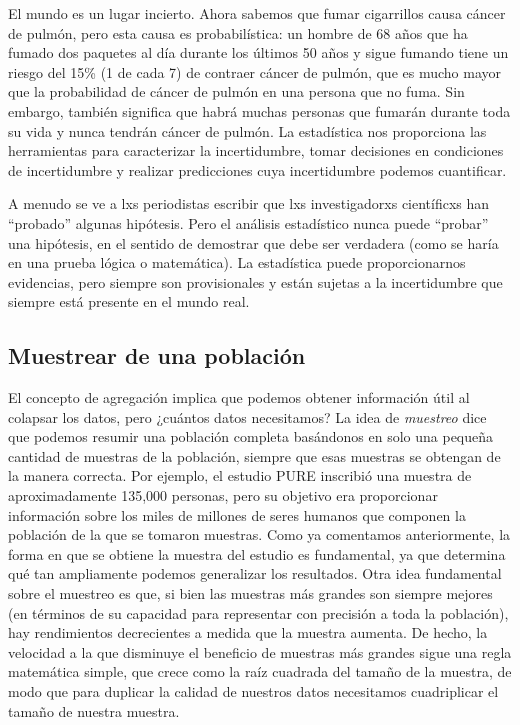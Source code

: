 \documentclass[
  12pt,
]{book}
\begin{document}
El mundo es un lugar incierto. Ahora sabemos que fumar cigarrillos causa cáncer de pulmón, pero esta causa es probabilística: un hombre de 68 años que ha fumado dos paquetes al día durante los últimos 50 años y sigue fumando tiene un riesgo del 15\% (1 de cada 7) de contraer cáncer de pulmón, que es mucho mayor que la probabilidad de cáncer de pulmón en una persona que no fuma. Sin embargo, también significa que habrá muchas personas que fumarán durante toda su vida y nunca tendrán cáncer de pulmón. La estadística nos proporciona las herramientas para caracterizar la incertidumbre, tomar decisiones en condiciones de incertidumbre y realizar predicciones cuya incertidumbre podemos cuantificar.

A menudo se ve a lxs periodistas escribir que lxs investigadorxs científicxs han ``probado'' algunas hipótesis. Pero el análisis estadístico nunca puede ``probar'' una hipótesis, en el sentido de demostrar que debe ser verdadera (como se haría en una prueba lógica o matemática). La estadística puede proporcionarnos evidencias, pero siempre son provisionales y están sujetas a la incertidumbre que siempre está presente en el mundo real.

\hypertarget{muestrear-de-una-poblaciuxf3n}{%
\subsection{Muestrear de una población}\label{muestrear-de-una-poblaciuxf3n}}

El concepto de agregación implica que podemos obtener información útil al colapsar los datos, pero ¿cuántos datos necesitamos? La idea de \emph{muestreo} dice que podemos resumir una población completa basándonos en solo una pequeña cantidad de muestras de la población, siempre que esas muestras se obtengan de la manera correcta. Por ejemplo, el estudio PURE inscribió una muestra de aproximadamente 135,000 personas, pero su objetivo era proporcionar información sobre los miles de millones de seres humanos que componen la población de la que se tomaron muestras. Como ya comentamos anteriormente, la forma en que se obtiene la muestra del estudio es fundamental, ya que determina qué tan ampliamente podemos generalizar los resultados. Otra idea fundamental sobre el muestreo es que, si bien las muestras más grandes son siempre mejores (en términos de su capacidad para representar con precisión a toda la población), hay rendimientos decrecientes a medida que la muestra aumenta. De hecho, la velocidad a la que disminuye el beneficio de muestras más grandes sigue una regla matemática simple, que crece como la raíz cuadrada del tamaño de la muestra, de modo que para duplicar la calidad de nuestros datos necesitamos cuadriplicar el tamaño de nuestra muestra.
\end{document}
